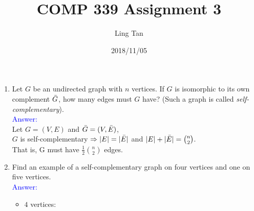 \documentclass[a4paper]{article}
\title{COMP 339 Assignment 3}
\author{Ling Tan}
\date{2018/11/05}
\begin{document}
\maketitle

\section{}
\begin{enumerate}[label=\alph*)]
      \item Let $G$ be an undirected graph with $n$ vertices. If $G$ is isomorphic to its own complement $\Bar{G}$, how many edges must $G$ have? (Such a graph is called \textit{self-complementary}).\\
          \textcolor{blue}{Answer:}\\
          Let $G=(V,E)$ and $\Bar{G}=(V,\Bar{E})$,\\
          $G$ is self-complementary $\Rightarrow|E|=|\Bar{E}|$ and $|E|+|\Bar{E}|=\binom{n}{2}$.\\
          That is, G must have $\frac{1}{2}\binom{n}{2}$ edges.
      \item Find an example of a self-complementary graph on four vertices and one on five vertices.\\
          \textcolor{blue}{Answer:}
          \begin{itemize}
              \item $4$ vertices:
                \begin{figure}[!htbp]
                    \begin{subfigure}[!htbp]{0.5\textwidth}
                        \centering

\end{subfigure}
\end{figure}
\end{itemize}
\end{enumerate}
\end{document}
